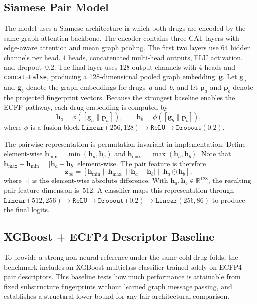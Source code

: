\documentclass[11pt,a4paper,twocolumn]{article}
\begin{document}
\subsection{Siamese Pair Model}
The model uses a Siamese architecture in which both drugs are encoded by the
same graph attention backbone.
The encoder contains three GAT layers with edge-aware attention and mean graph
pooling.
The first two layers use 64 hidden channels per head, 4 heads, concatenated
multi-head outputs, ELU activation, and dropout~0.2.
The final layer uses 128 output channels with 4 heads and \texttt{concat=False},
producing a 128-dimensional pooled graph embedding~$\mathbf{g}$.
Let $\mathbf{g}_a$ and $\mathbf{g}_b$ denote the graph embeddings for drugs~$a$
and~$b$, and let $\mathbf{p}_a$ and $\mathbf{p}_b$ denote the projected
fingerprint vectors.
Because the strongest baseline enables the ECFP pathway, each drug embedding is
computed by
\begin{equation}
  \mathbf{h}_a = \phi([\mathbf{g}_a \| \mathbf{p}_a]), \qquad
  \mathbf{h}_b = \phi([\mathbf{g}_b \| \mathbf{p}_b]),
\end{equation}
where $\phi$ is a fusion block
$\texttt{Linear}(256,128) \rightarrow \texttt{ReLU} \rightarrow
\texttt{Dropout}(0.2)$.

The pairwise representation is permutation-invariant in implementation.
Define element-wise $\mathbf{h}_{\min} = \min(\mathbf{h}_a,\mathbf{h}_b)$ and
$\mathbf{h}_{\max} = \max(\mathbf{h}_a,\mathbf{h}_b)$.
Note that $\mathbf{h}_{\max} - \mathbf{h}_{\min} = |\mathbf{h}_a - \mathbf{h}_b|$
element-wise.
The pair feature is therefore
\begin{equation}
  \mathbf{z}_{ab} =
  [\mathbf{h}_{\min} \| \mathbf{h}_{\max} \|
  |\mathbf{h}_a - \mathbf{h}_b| \|
  \mathbf{h}_a \odot \mathbf{h}_b],
\end{equation}
where $|\cdot|$ is the element-wise absolute difference.
With $\mathbf{h}_a, \mathbf{h}_b \in \mathbb{R}^{128}$, the resulting pair
feature dimension is~512.
A classifier maps this representation through
$\texttt{Linear}(512,256) \rightarrow \texttt{ReLU} \rightarrow
\texttt{Dropout}(0.2) \rightarrow \texttt{Linear}(256,86)$
to produce the final logits.

\subsection{XGBoost + ECFP4 Descriptor Baseline}
\label{sec:xgboost}
To provide a strong non-neural reference under the same cold-drug folds, the
benchmark includes an XGBoost multiclass classifier trained solely on ECFP4
pair descriptors.
This baseline tests how much performance is attainable from fixed substructure
fingerprints without learned graph message passing, and establishes a
structural lower bound for any fair architectural comparison.
\end{document}

